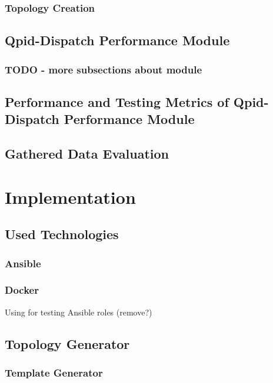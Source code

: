 \subsection{Topology Creation}

\section{Qpid-Dispatch Performance Module}

\subsection{TODO - more subsections about module}

\section{Performance and Testing Metrics of Qpid-Dispatch Performance Module}

\section{Gathered Data Evaluation}

\chapter{Implementation}
\label{Implementation}

\section{Used Technologies}

\subsection{Ansible}

\subsection{Docker}
Using for testing Ansible roles (remove?)

\section{Topology Generator}

\subsection{Template Generator}

